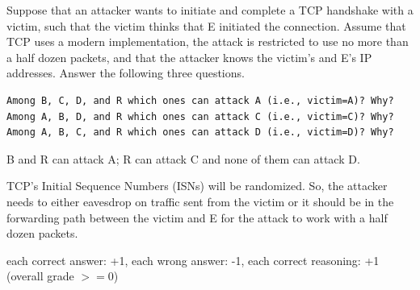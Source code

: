 \documentclass[addpoints,answers]{exam}
\begin{document}
\begin{questions}
\begin{parts}
Suppose that an attacker wants to initiate and complete a TCP
handshake with a victim, such that the victim thinks that E initiated
the connection. Assume that TCP uses a modern implementation, the
attack is restricted to use no more than a half dozen packets, and
that the attacker knows the victim's and E's IP addresses. Answer
the following three questions.

\begin{lstlisting}
Among B, C, D, and R which ones can attack A (i.e., victim=A)? Why?
Among A, B, D, and R which ones can attack C (i.e., victim=C)? Why?
Among A, B, C, and R which ones can attack D (i.e., victim=D)? Why?
\end{lstlisting}

\begin{solutionorbox}[1in]    
B and R can attack A; R can attack C and none of them can attack D.

TCP's Initial Sequence Numbers (ISNs) will be randomized. So, the
attacker needs to either eavesdrop on traffic sent from the victim or
it should be in the forwarding path between the victim and E for the
attack to work with a half dozen packets.

each correct answer: +1, each wrong answer: -1, each correct reasoning: +1 (overall grade $>=0$)
\end{solutionorbox}

\end{parts}

\pagebreak


\end{questions}
\end{document}
